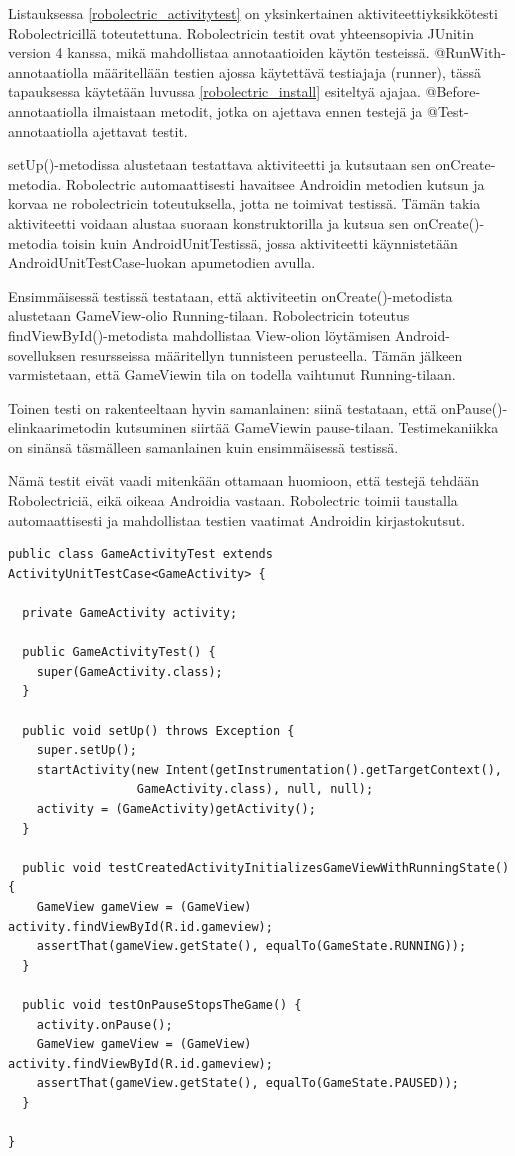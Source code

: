 Listauksessa \ref{robolectric_activitytest} on yksinkertainen aktiviteettiyksikkötesti Robolectricillä toteutettuna. Robolectricin testit ovat yhteensopivia JUnitin version 4 kanssa, mikä mahdollistaa annotaatioiden käytön testeissä. @RunWith-annotaatiolla määritellään testien ajossa käytettävä testiajaja (runner), tässä tapauksessa käytetään luvussa \ref{robolectric_install} esiteltyä ajajaa. @Before-annotaatiolla ilmaistaan metodit, jotka on ajettava ennen testejä ja @Test-annotaatiolla ajettavat testit.

setUp()-metodissa alustetaan testattava aktiviteetti ja kutsutaan sen onCreate-metodia. Robolectric automaattisesti havaitsee Androidin metodien kutsun ja korvaa ne robolectricin toteutuksella, jotta ne toimivat testissä. Tämän takia aktiviteetti voidaan alustaa suoraan konstruktorilla ja kutsua sen onCreate()-metodia toisin kuin AndroidUnitTestissä, jossa aktiviteetti käynnistetään AndroidUnitTestCase-luokan apumetodien avulla.

Ensimmäisessä testissä testataan, että aktiviteetin onCreate()-metodista alustetaan GameView-olio Running-tilaan. Robolectricin toteutus findViewById()-metodista mahdollistaa View-olion löytämisen Android-sovelluksen resursseissa määritellyn tunnisteen perusteella. Tämän jälkeen varmistetaan, että GameViewin tila on todella vaihtunut Running-tilaan. 

Toinen testi on rakenteeltaan hyvin samanlainen: siinä testataan, että onPause()-elinkaarimetodin kutsuminen siirtää GameViewin pause-tilaan. Testimekaniikka on sinänsä täsmälleen samanlainen kuin ensimmäisessä testissä.

Nämä testit eivät vaadi mitenkään ottamaan huomioon, että testejä tehdään Robolectriciä, eikä oikeaa Androidia vastaan. Robolectric toimii taustalla automaattisesti ja mahdollistaa testien vaatimat Androidin kirjastokutsut.

\begin{lstlisting}[float,label=androidunit_activitytest,caption=ActivityUnitTestCase]
public class GameActivityTest extends ActivityUnitTestCase<GameActivity> {

  private GameActivity activity;

  public GameActivityTest() {
  	super(GameActivity.class);
  }

  public void setUp() throws Exception {
  	super.setUp();
  	startActivity(new Intent(getInstrumentation().getTargetContext(), 
  	              GameActivity.class), null, null);
    activity = (GameActivity)getActivity();
  }

  public void testCreatedActivityInitializesGameViewWithRunningState() {
    GameView gameView = (GameView) activity.findViewById(R.id.gameview);
    assertThat(gameView.getState(), equalTo(GameState.RUNNING));
  }
  
  public void testOnPauseStopsTheGame() {
  	activity.onPause();
  	GameView gameView = (GameView) activity.findViewById(R.id.gameview);
  	assertThat(gameView.getState(), equalTo(GameState.PAUSED));
  }
  
}
\end{lstlisting}

